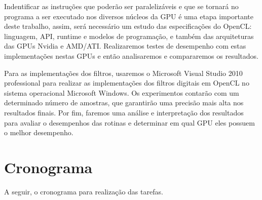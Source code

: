 Indentificar as instruções que poderão ser paralelizáveis e que se tornará no programa a ser executado nos diversos núcleos da GPU é uma etapa importante deste trabalho, assim, será necessário um estudo das especificações do OpenCL: linguagem, API, runtime e modelos de programação, e também das arquiteturas das GPUs Nvidia e AMD/ATI. Realizaremos testes de desempenho com estas implementações nestas GPUs e então analisaremos e compararemos os resultados.

Para as implementações dos filtros, usaremos o Microsoft Visual Studio 2010 professional para realizar as implementações dos filtros digitais em OpenCL no sistema operacional Microsoft Windows. Os experimentos contarão com um determinado número de amostras, que garantirão uma precisão mais alta nos resultados finais.  Por fim, faremos uma análise e interpretação dos resultados para avaliar o desempenhos das rotinas e determinar em qual GPU eles possuem o melhor desempenho.


\section{Cronograma}
A seguir, o cronograma para realização das tarefas.








